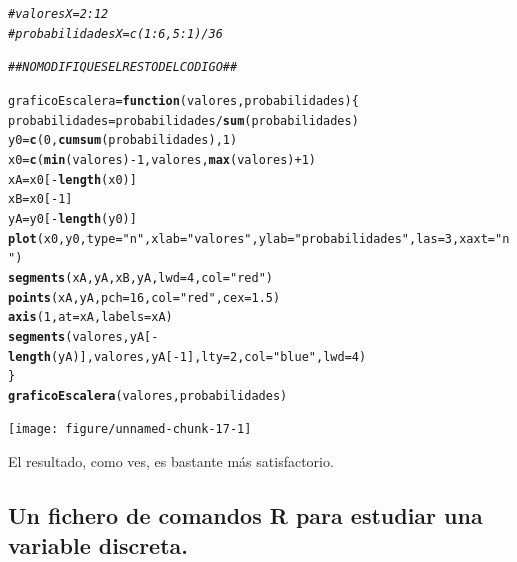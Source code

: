 \documentclass[10pt,a4paper]{article}\usepackage[]{graphicx}\usepackage[]{color}
\makeatletter
\newcommand{\hlnum}[1]{\textcolor[rgb]{0.686,0.059,0.569}{#1}}%
\newcommand{\hlstr}[1]{\textcolor[rgb]{0.192,0.494,0.8}{#1}}%
\newcommand{\hlcom}[1]{\textcolor[rgb]{0.678,0.584,0.686}{\textit{#1}}}%
\newcommand{\hlopt}[1]{\textcolor[rgb]{0,0,0}{#1}}%
\newcommand{\hlstd}[1]{\textcolor[rgb]{0.345,0.345,0.345}{#1}}%
\newcommand{\hlkwa}[1]{\textcolor[rgb]{0.161,0.373,0.58}{\textbf{#1}}}%
\newcommand{\hlkwb}[1]{\textcolor[rgb]{0.69,0.353,0.396}{#1}}%
\newcommand{\hlkwc}[1]{\textcolor[rgb]{0.333,0.667,0.333}{#1}}%
\newcommand{\hlkwd}[1]{\textcolor[rgb]{0.737,0.353,0.396}{\textbf{#1}}}%
\newenvironment{kframe}{%
 \def\at@end@of@kframe{}%
 \ifinner\ifhmode%
  \def\at@end@of@kframe{\end{minipage}}%
  \begin{minipage}{\columnwidth}%
 \fi\fi%
 \def\FrameCommand##1{\hskip\@totalleftmargin \hskip-\fboxsep
 \colorbox{shadecolor}{##1}\hskip-\fboxsep
     \hskip-\linewidth \hskip-\@totalleftmargin \hskip\columnwidth}%
 \MakeFramed {\advance\hsize-\width
   \@totalleftmargin\z@ \linewidth\hsize
   \@setminipage}}%
 {\par\unskip\endMakeFramed%
 \at@end@of@kframe}
\newenvironment{knitrout}{}{} %
\makeatother
\begin{document}
\begin{knitrout}
\color{fgcolor}\begin{kframe}
\begin{alltt}
\hlcom{# valoresX = 2:12}
\hlcom{# probabilidadesX = c(1:6,5:1) / 36}

\hlcom{##  NO MODIFIQUES EL RESTO DEL CODIGO ##}

\hlstd{graficoEscalera} \hlkwb{=} \hlkwa{function}\hlstd{(}\hlkwc{valores}\hlstd{,} \hlkwc{probabilidades} \hlstd{)\{}
  \hlstd{probabilidades} \hlkwb{=} \hlstd{probabilidades}\hlopt{/}\hlkwd{sum}\hlstd{(probabilidades)}
  \hlstd{y0} \hlkwb{=} \hlkwd{c}\hlstd{(}\hlnum{0}\hlstd{,}\hlkwd{cumsum}\hlstd{(probabilidades),} \hlnum{1}\hlstd{)}
  \hlstd{x0} \hlkwb{=} \hlkwd{c}\hlstd{(}\hlkwd{min}\hlstd{(valores)}\hlopt{-}\hlnum{1}\hlstd{,valores,} \hlkwd{max}\hlstd{(valores)}\hlopt{+}\hlnum{1}\hlstd{)}
  \hlstd{xA} \hlkwb{=} \hlstd{x0[}\hlopt{-}\hlkwd{length}\hlstd{(x0)]}
  \hlstd{xB} \hlkwb{=} \hlstd{x0[}\hlopt{-}\hlnum{1}\hlstd{]}
  \hlstd{yA} \hlkwb{=} \hlstd{y0[}\hlopt{-}\hlkwd{length}\hlstd{(y0)]}
  \hlkwd{plot}\hlstd{(x0, y0,} \hlkwc{type}\hlstd{=}\hlstr{"n"}\hlstd{,} \hlkwc{xlab}\hlstd{=}\hlstr{"valores"}\hlstd{,} \hlkwc{ylab}\hlstd{=}\hlstr{"probabilidades"}\hlstd{,} \hlkwc{las}\hlstd{=}\hlnum{3}\hlstd{,} \hlkwc{xaxt}\hlstd{=}\hlstr{"n"}\hlstd{)}
  \hlkwd{segments}\hlstd{(xA,yA,xB,yA,} \hlkwc{lwd}\hlstd{=}\hlnum{4}\hlstd{,} \hlkwc{col}\hlstd{=}\hlstr{"red"}\hlstd{)}
  \hlkwd{points}\hlstd{(xA, yA,} \hlkwc{pch}\hlstd{=}\hlnum{16}\hlstd{,} \hlkwc{col}\hlstd{=}\hlstr{"red"}\hlstd{,} \hlkwc{cex}\hlstd{=}\hlnum{1.5}\hlstd{)}
  \hlkwd{axis}\hlstd{(}\hlnum{1}\hlstd{,} \hlkwc{at}\hlstd{=xA,}   \hlkwc{labels}\hlstd{=xA)}
  \hlkwd{segments}\hlstd{(valores, yA[}\hlopt{-}\hlkwd{length}\hlstd{(yA)] , valores, yA[}\hlopt{-}\hlnum{1}\hlstd{],} \hlkwc{lty}\hlstd{=}\hlnum{2}\hlstd{,} \hlkwc{col}\hlstd{=}\hlstr{"blue"}\hlstd{,} \hlkwc{lwd}\hlstd{=}\hlnum{4}\hlstd{)}
\hlstd{\}}
\hlkwd{graficoEscalera}\hlstd{(valores, probabilidades)}
\end{alltt}
\end{kframe}
\texttt{[image: figure/unnamed-chunk-17-1]} 

\end{knitrout}
El resultado, como ves, es bastante más satisfactorio.

\subsection{Un fichero de comandos R para estudiar una variable discreta.}
\label{tut04:subsec:FicheroComandosRParaVaraiableDiscreta}
\end{document}
